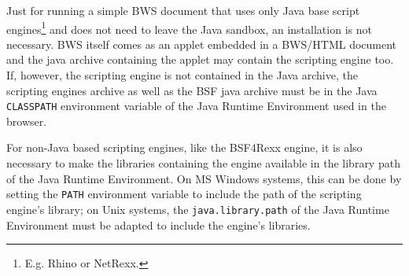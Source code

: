 Just for running a simple BWS document that uses only Java base script engines\footnote{E.g. Rhino or NetRexx.} and does not need to leave the Java sandbox, an installation is not necessary. BWS itself comes as an applet embedded in a BWS/HTML document and the java archive containing the applet may contain the scripting engine too. If, however, the scripting engine is not contained in the Java archive, the scripting engines archive as well as the BSF java archive must be in the Java \texttt{CLASSPATH} environment variable of the Java Runtime Environment used in the browser.

For non-Java based scripting engines, like the BSF4Rexx engine, it is also necessary to make the libraries containing the engine available in the library path of the Java Runtime Environment. On MS Windows systems, this can be done by setting the \texttt{PATH} environment variable to include the path of the scripting engine's library; on Unix systems, the \texttt{java.library.path} of the Java Runtime Environment must be adapted to include the engine's libraries.